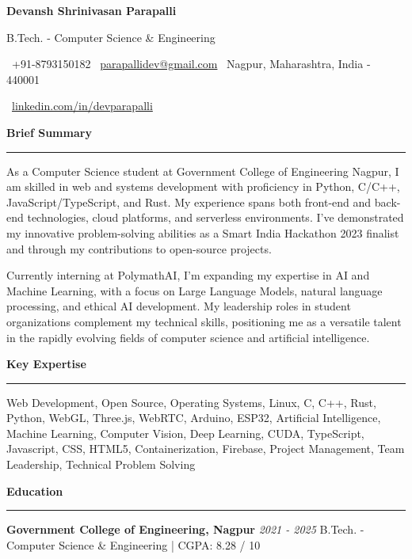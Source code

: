 \documentclass[a4paper,11pt]{article}
\renewcommand{\section}[1]{\vspace{0.5em}\textbf{\Large #1}\vspace{0.2em}\hrule\vspace{0.5em}}
\renewcommand{\subsection}[1]{\vspace{0.3em}\textbf{\large #1}\vspace{0.2em}}
\newcommand{\daterange}[2]{\textit{#1 - #2}}
\begin{document}
\centerline{\huge\bfseries Devansh Shrinivasan Parapalli}
\vspace{0.5em}
\centerline{B.Tech. - Computer Science \& Engineering}
\vspace{0.5em}
\centerline{
    \faPhone\ +91-8793150182 \quad
    \faEnvelope\ \href{mailto:parapallidev@gmail.com}{parapallidev@gmail.com} \quad
    \faMapMarker\ Nagpur, Maharashtra, India - 440001
}
\centerline{
    \faLinkedin\ \href{https://linkedin.com/in/devparapalli}{linkedin.com/in/devparapalli}
}

\section{Brief Summary}
As a Computer Science student at Government College of Engineering Nagpur, I am skilled in web and systems development with proficiency in Python, C/C++, JavaScript/TypeScript, and Rust. My experience spans both front-end and back-end technologies, cloud platforms, and serverless environments. I've demonstrated my innovative problem-solving abilities as a Smart India Hackathon 2023 finalist and through my contributions to open-source projects.

Currently interning at PolymathAI, I'm expanding my expertise in AI and Machine Learning, with a focus on Large Language Models, natural language processing, and ethical AI development. My leadership roles in student organizations complement my technical skills, positioning me as a versatile talent in the rapidly evolving fields of computer science and artificial intelligence.

\section{Key Expertise}
Web Development, Open Source, Operating Systems, Linux, C, C++, Rust, Python, WebGL, Three.js, WebRTC, Arduino, ESP32, Artificial Intelligence, Machine Learning, Computer Vision, Deep Learning, CUDA, TypeScript, Javascript, CSS, HTML5, Containerization, Firebase, Project Management, Team Leadership, Technical Problem Solving

\section{Education}
\subsection{Government College of Engineering, Nagpur}
\daterange{2021}{2025}
B.Tech. - Computer Science \& Engineering | CGPA: 8.28 / 10
\end{document}
